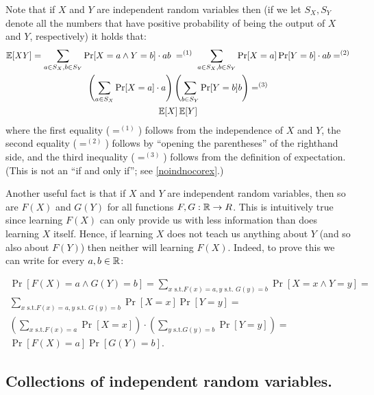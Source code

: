 Note that if \(X\) and \(Y\) are independent random variables then (if
we let \(S_X,S_Y\) denote all the numbers that have positive probability
of being the output of \(X\) and \(Y\), respectively) it holds that:
\begin{equation*}
\begin{gathered}
\operatorname*{\mathbb E}[ \mathit{XY} ] = \sum_{a \in S_X,b \in S_Y} {\textstyle\Pr[X=a \wedge Y=b]}\cdot ab \; =^{(1)} \; \sum_{a \in S_X,b \in S_Y} {\textstyle \Pr[X=a]\Pr[Y=b]}\cdot ab =^{(2)} \\
\left(\sum_{a \in S_X} {\textstyle \Pr[X=a]}\cdot a\right)\left(\sum_{b \in S_Y} {\textstyle \Pr[Y=b]}b\right) =^{(3)} \\
\operatorname*{\mathbb E}[X] \operatorname*{\mathbb E}[Y]
\end{gathered}
\end{equation*}
where the first equality (\(=^{(1)}\)) follows from the independence of
\(X\) and \(Y\), the second equality (\(=^{(2)}\)) follows by ``opening
the parentheses'' of the righthand side, and the third inequality
(\(=^{(3)}\)) follows from the definition of expectation. (This is not
an ``if and only if''; see \cref{noindnocorex}.)

Another useful fact is that if \(X\) and \(Y\) are independent random
variables, then so are \(F(X)\) and \(G(Y)\) for all functions
\(F,G:{\mathbb{R}} \rightarrow R\). This is intuitively true since learning
\(F(X)\) can only provide us with less information than does learning
\(X\) itself. Hence, if learning \(X\) does not teach us anything about
\(Y\) (and so also about \(F(Y)\)) then neither will learning \(F(X)\).
Indeed, to prove this we can write for every \(a,b \in {\mathbb{R}}\):

\begin{equation*}
\begin{gathered}
\Pr[ F(X)=a \wedge G(Y)=b ] = \sum_{x \text{ s.t.} F(x)=a, y \text{ s.t. } G(y)=b} \Pr[ X=x \wedge Y=y ] = \\
\sum_{x \text{ s.t.} F(x)=a, y \text{ s.t. } G(y)=b} \Pr[ X=x ] \Pr[  Y=y ]  = \\
\left( \sum_{x \text{ s.t.} F(x)=a } \Pr[X=x ] \right) \cdot \left( \sum_{y \text{ s.t.} G(y)=b } \Pr[Y=y ] \right) = \\
\Pr[ F(X)=a] \Pr[G(Y)=b] .
\end{gathered}
\end{equation*}

\subsection{Collections of independent random
variables.}\label{0-Collections-of-indepen}

